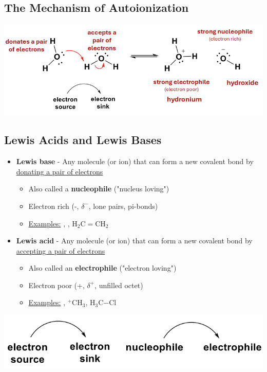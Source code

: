 \documentclass[10pt]{article}
\newcommand{\water}{\text{H$_2$O}}
\newcommand{\hydroxide}{\text{OH$^-$}}
\newcommand{\hydronium}{\text{H$_3$O$^+$}}
\newcommand{\pc}{$^+$}
\begin{document}
\subsection*{The Mechanism of Autoionization}
\begin{center}
    \includegraphics[width=\textwidth]{L3_2.png}
\end{center}
\subsection*{Lewis Acids and Lewis Bases}
\begin{itemize}
    \item \textbf{Lewis base} - Any molecule (or ion) that can form a new covalent bond by \underline{donating a pair of electrons}
    \begin{itemize}
        \item Also called a \textbf{nucleophile} ("nucleus loving")
        \item Electron rich (-, $\delta^-$, lone pairs, pi-bonds)
        \item \underline{Examples:} \water, \hydroxide, H$_2$C$=$CH$_2$
    \end{itemize}
    \item \textbf{Lewis acid} - Any molecule (or ion) that can form a new covalent bond by \underline{accepting a pair of electrons}
    \begin{itemize}
        \item Also called an \textbf{electrophile} ("electron loving")
        \item Electron poor (+, $\delta^+$, unfilled octet)
        \item \underline{Examples:} \hydronium, \pc CH$_3$, H$_3$C$-$Cl
    \end{itemize}
\end{itemize}
\begin{center}
    \includegraphics[scale=0.5]{L3_3.png}
\end{center}
\end{document}
